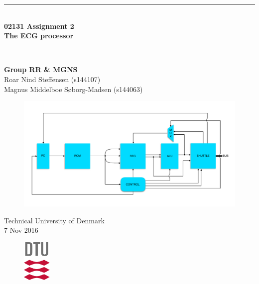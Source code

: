 \begin{titlepage}
\centering
\parindent=0pt
\newcommand{\HRule}{\rule{\textwidth}{1mm}}
 \HRule\\[1cm]\huge\textbf
{02131 Assignment 2 \\The ECG processor}\\[0.1cm]
\HRule\\[3cm]\vspace{-1 cm} \textbf{\Large{Group RR \& MGNS}}\\
\large{
Roar Nind Steffensen (s144107)\\
Magnus Middelboe Søborg-Madsen (s144063)}

\vspace{2 cm}

\vspace{0.5cm}
\begin{figure}[H]
\centering
\includegraphics[width=1.0\textwidth]{frontpage/ComputerArkitecture_FP}
\label{fig:front}
\end{figure}

 \normalsize %
Technical University of Denmark\\
7 Nov 2016
\begin{figure}[h]
    \centering
    \includegraphics[height=2cm]{frontpage/DTUlogo.png}
\end{figure}
\end{titlepage}
